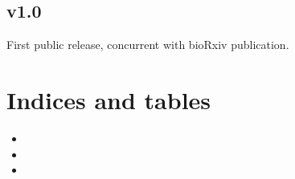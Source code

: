 \documentclass[letterpaper,12pt,english]{sphinxmanual}
\begin{document}
\section{v1.0}
\label{\detokenize{releases:v1-0}}
First public release, concurrent with bioRxiv publication.


\chapter{Indices and tables}
\label{\detokenize{index:indices-and-tables}}\begin{itemize}
\item {} 

\item {} 

\item {} 

\end{itemize}



\renewcommand{\indexname}{Index}
\printindex
\end{document}
